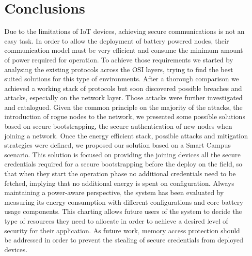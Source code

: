 \documentclass{sig-alternate-05-2015}
\begin{document}
\section{Conclusions}
\label{sec:conclusion}
Due to the limitations of \gls{IoT} devices, achieving secure communications is not an easy task. In order to allow the deployment of battery powered nodes, their communication model must be very efficient and consume the minimum amount of power required for operation. To achieve those requirements we started by analysing the existing protocols across the OSI layers, trying to find the best suited solutions for this type of environments. After a thorough comparison we achieved a working stack of protocols but soon discovered possible breaches and attacks, especially on the network layer. Those attacks were further investigated and catalogued. Given the common principle on the majority of the attacks, the introduction of rogue nodes to the network, we presented some possible solutions based on secure bootstrapping, the secure authentication of new nodes when joining a network.
Once the energy efficient stack, possible attacks and mitigation strategies were defined, we proposed our solution based on a Smart Campus scenario. This solution is focused on providing the joining devices all the secure credentials required for a secure bootstrapping before the deploy on the field, so that when they start the operation phase no additional credentials need to be fetched, implying that no additional energy is spent on configuration.
Always maintaining a power-aware perspective, the system has been evaluated by measuring its energy consumption with different configurations and core battery usage components. This charting allows future users of the system to decide the type of resources they need to allocate in order to achieve a desired level of security for their application.
As future work, memory access protection should be addressed in order to prevent the stealing of secure credentials from deployed devices.


%

%
%
\end{document}
